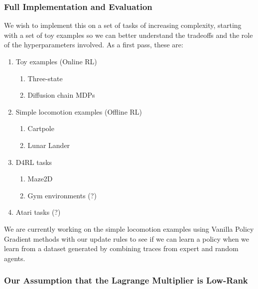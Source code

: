 \documentclass[11pt]{article}
\begin{document}
\subsubsection{Full Implementation and Evaluation }

We wish to implement this on a set of tasks of increasing complexity, starting with a set of toy examples so we can better understand the tradeoffs and the role of the hyperparameters involved. As a first pass, these are:
\begin{enumerate}
  \item Toy examples (Online RL)
  \begin{enumerate}
    \item Three-state
    \item Diffusion chain MDPs
  \end{enumerate}

  \item Simple locomotion examples (Offline RL)
  \begin{enumerate}
    \item Cartpole
    \item Lunar Lander
  \end{enumerate}

  \item D4RL tasks
  \begin{enumerate}
    \item Maze2D
    \item Gym environments (?)
  \end{enumerate}

  \item Atari tasks (?)
\end{enumerate}

We are currently working on the simple locomotion examples using Vanilla Policy Gradient methods with our update rules to see if we can learn a policy when we learn from a dataset generated by combining traces from expert and random agents.

\subsubsection{Our Assumption that the Lagrange Multiplier is Low-Rank }
\end{document}
